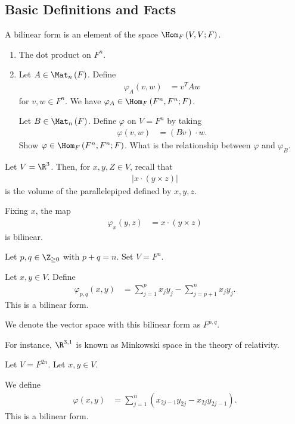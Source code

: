 \documentclass[10pt]{mypackage}
\begin{document}
  \subsection{Basic Definitions and Facts}%
  \begin{definition}
    A bilinear form is an element of the space $\Hom_{F}\left(V,V;F\right)$.
  \end{definition}
  \begin{example}\hfill
    \begin{enumerate}[(1)]
      \item The dot product on $F^n$.
      \item Let $A\in \Mat_{n}\left(F\right)$. Define
        \begin{align*}
          \varphi_{A}\left(v,w\right) &= v^{T}Aw
        \end{align*}
        for $v,w\in F^n$. We have $\varphi_{A}\in \Hom_{F}\left(F^n,F^n;F\right)$.
  \begin{exercise}
    Let $B\in \Mat_{n}\left(F\right)$. Define $\varphi$ on $V = F^n$ by taking
    \begin{align*}
      \varphi\left(v,w\right) &= \left(Bv\right)\cdot w.
    \end{align*}
    Show $\varphi\in \Hom_{F}\left(F^n,F^n;F\right)$. What is the relationship between $\varphi$ and $\varphi_{B}$.
  \end{exercise}
    \end{enumerate}
  \end{example}
  \begin{example}
    Let $V = \R^3$. Then, for $x,y,Z\in V$, recall that
    \begin{align*}
      \left\vert x\cdot \left(y\times z\right) \right\vert
    \end{align*}
    is the volume of the parallelepiped defined by $x,y,z$.\newline

    Fixing $x$, the map
    \begin{align*}
      \varphi_{x}\left(y,z\right) &= x\cdot \left(y\times z\right)
    \end{align*}
    is bilinear.
  \end{example}
  \begin{example}
    Let $p,q\in \Z_{\geq 0}$ with $p+q = n$. Set $V = F^n$.\newline

    Let $x,y\in V$. Define
    \begin{align*}
      \varphi_{p,q}\left(x,y\right) &= \sum_{j=1}^{p}x_jy_j - \sum_{j=p+1}^{n}x_jy_j.
    \end{align*}
    This is a bilinear form.\newline

    We denote the vector space with this bilinear form as $F^{p,q}$.\newline

    For instance, $\R^{3,1}$ is known as Minkowski space in the theory of relativity.
  \end{example}
  \begin{example}
    Let $V = F^{2n}$. Let $x,y\in V$.\newline

    We define
    \begin{align*}
      \varphi\left(x,y\right) &= \sum_{j=1}^{n}\left(x_{2j-1}y_{2j} - x_{2j}y_{2j-1}\right).
    \end{align*}
    This is a bilinear form.
  \end{example}
  
\end{document}
